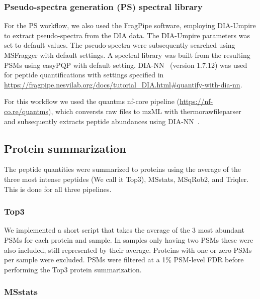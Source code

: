 \documentclass[10pt,letterpaper]{article}
\begin{document}
\subsubsection*{Pseudo-spectra generation (PS) spectral library}

For the PS workflow, we also used the FragPipe software, employing DIA-Umpire to extract pseudo-spectra from the DIA data. The DIA-Umpire parameters was set to default values. The pseudo-spectra were subsequently searched using MSFragger with default settings. A spectral library was built from the resulting PSMs using easyPQP with default setting. DIA-NN~\cite{demichev2020dia} (version 1.7.12) was used for peptide quantifications with settings specified in \url{https://fragpipe.nesvilab.org/docs/tutorial_DIA.html#quantify-with-dia-nn}. 


For this workflow we used the quantms nf-core pipeline (\url{https://nf-co.re/quantms}), which conversts raw files to mzML with thermorawfileparser~\cite{hulstaert2019thermorawfileparser} and subsequently extracts peptide abundances using DIA-NN~\cite{hulstaert2019thermorawfileparser}.


\subsection*{Protein summarization}

The peptide quantities were summarized to proteins using the average of the three most intense peptides (We call it Top3), MSstats, MSqRob2, and Triqler. This is done for all three pipelines. 

\subsubsection*{Top3}

We implemented a short script that takes the average of the 3 most abundant PSMs for each protein and sample. In samples only having two PSMs these were also included, still represented by their average. Proteins with one or zero PSMs per sample were excluded. PSMs were filtered at a 1\% PSM-level FDR before performing the Top3 protein summarization. 

\subsubsection*{MSstats}
\end{document}
